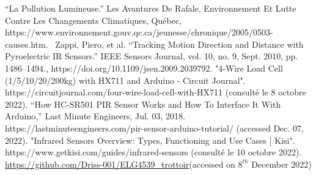 \documentclass[journal]{IEEEtran}
\begin{document}
\begin{thebibliography}{00}
 “La Pollution Lumineuse.” Les Avantures De Rafale, Environnement Et Lutte Contre Les Changements Climatiques, Québec, https://www.environnement.gouv.qc.ca/jeunesse/chronique/2005/0503-causes.htm. 
 Zappi, Piero, et al. “Tracking Motion Direction and Distance with Pyroelectric IR Sensors.” IEEE Sensors Journal, vol. 10, no. 9, Sept. 2010, pp. 1486–1494., https://doi.org/10.1109/jsen.2009.2039792.
 "4-Wire Load Cell (1/5/10/20/200kg) with HX711 and Arduino - Circuit Journal". https://circuitjournal.com/four-wire-load-cell-with-HX711 (consulté le 8 octobre 2022).
 “How HC-SR501 PIR Sensor Works and How To Interface It With Arduino,” Last Minute Engineers, Jul. 03, 2018. https://lastminuteengineers.com/pir-sensor-arduino-tutorial/ (accessed Dec. 07, 2022).
 "Infrared Sensors Overview: Types, Functioning and Use Cases | Kisi". https://www.getkisi.com/guides/infrared-sensors (consulté le 10 octobre 2022).
 {\url{https://github.com/Driss-001/ELG4539_trottoir}}(accessed on $8^{th}$ December 2022)
\end{thebibliography}
\vspace{12pt}
\end{document}
